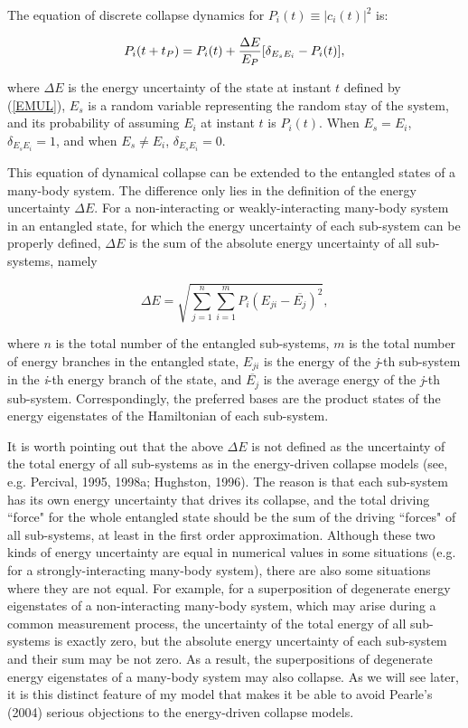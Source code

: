 \noindent  The equation of discrete collapse dynamics for $P_i(t) \equiv |c_i(t)|^2$ is:

\begin{equation}
P_i(t+t_P) = P_i(t) +{\Delta E \over E_P} [\delta_{E_sE_i}-P_i(t)],
\label{EDC}
\end{equation}

\noindent  where $\Delta E$ is the energy uncertainty of the state at instant $t$ defined by (\ref {EMUL}), $E_s$ is a random variable representing the random stay of the system, and its probability of assuming $E_i$ at instant $t$ is $P_i(t)$. When $E_s=E_i$, $\delta_{E_sE_i}=1$, and when $E_s \neq E_i$, $\delta_{E_sE_i}=0$.

This equation of dynamical collapse can be extended to the entangled states of a many-body system. The difference only lies in the definition of the energy uncertainty $\Delta E$. For a non-interacting or weakly-interacting many-body system in an entangled state, for which the energy uncertainty of each sub-system can be properly defined, $\Delta E$ is the sum of the absolute energy uncertainty of all sub-systems, namely

\begin{equation}
\Delta E =\sqrt{\sum_{j=1}^n  \sum_{i=1}^{m} {P_i(E_{ji}-\overline{E_j})^2}  },
\label{E}
\end{equation}

\noindent where $n$ is the total number of the entangled sub-systems, $m$ is the total number of energy branches in the entangled state, $E_{ji}$ is the energy of the \emph{j}-th sub-system in the \emph{i}-th energy branch of the state, and $\overline{E_j}$ is the average energy of the \emph{j}-th sub-system. Correspondingly, the preferred bases are the product states of the energy eigenstates of the Hamiltonian of each sub-system. 

It is worth pointing out that the above $\Delta E$ is not defined as the uncertainty of the total energy of all sub-systems as in the energy-driven collapse models (see, e.g. Percival, 1995, 1998a; Hughston, 1996). The reason is that  each sub-system has its own energy uncertainty that drives its collapse, and the total driving ``force" for the whole entangled state should be the sum of the driving ``forces" of all sub-systems, at least in the first order approximation. Although these two kinds of energy uncertainty are equal in numerical values in some situations (e.g. for a strongly-interacting many-body system),  there are also some situations where they are not equal. For example, for a superposition of degenerate energy eigenstates of a non-interacting many-body system, which may arise during a common measurement process, the uncertainty of the total energy of all sub-systems is exactly zero, but the absolute energy uncertainty of each sub-system and their sum may be not zero. As a result, the superpositions of degenerate energy eigenstates of a many-body system may also collapse. As we will see later, it is this distinct feature of my model that makes it be able to avoid Pearle's (2004) serious objections to the energy-driven collapse models.

